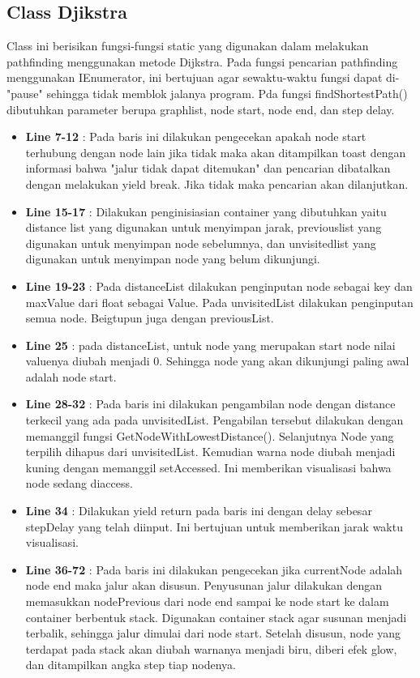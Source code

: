 \documentclass[12pt,a4paper,oneside]{article}
\begin{document}
\subsection{Class Djikstra}
Class ini berisikan fungsi-fungsi static yang digunakan dalam melakukan pathfinding menggunakan metode Dijkstra. Pada fungsi pencarian pathfinding menggunakan IEnumerator, ini bertujuan agar sewaktu-waktu fungsi dapat di-"pause" sehingga tidak memblok jalanya program. Pda fungsi findShortestPath() dibutuhkan parameter berupa graphlist, node start, node end, dan step delay.
\begin{itemize}
	\item \textbf{Line 7-12} : Pada baris ini dilakukan pengecekan apakah node start terhubung dengan node lain jika tidak maka akan ditampilkan toast dengan informasi bahwa "jalur tidak dapat ditemukan" dan pencarian dibatalkan dengan melakukan yield break. Jika tidak maka pencarian akan dilanjutkan.
	\item \textbf{Line 15-17} : Dilakukan penginisiasian container yang dibutuhkan yaitu distance list yang digunakan untuk menyimpan jarak, previouslist yang digunakan untuk menyimpan node sebelumnya, dan unvisitedlist yang digunakan untuk menyimpan node yang belum dikunjungi. 
	\item \textbf{Line 19-23} : Pada distanceList dilakukan penginputan node sebagai key dan maxValue dari float sebagai Value. Pada unvisitedList dilakukan penginputan semua node. Beigtupun juga dengan previousList.
	\item \textbf{Line 25} : pada distanceList, untuk node yang merupakan start node nilai valuenya diubah menjadi 0. Sehingga node yang akan dikunjungi paling awal adalah node start.
	\item \textbf{Line 28-32} : Pada baris ini dilakukan pengambilan node dengan distance terkecil yang ada pada unvisitedList. Pengabilan tersebut dilakukan dengan memanggil fungsi GetNodeWithLowestDistance(). Selanjutnya Node yang terpilih dihapus dari unvisitedList. Kemudian warna node diubah menjadi kuning dengan memanggil setAccessed. Ini memberikan visualisasi bahwa node sedang diaccess.
	\item \textbf{Line 34} : Dilakukan yield return pada baris ini dengan delay sebesar stepDelay yang telah diinput. Ini bertujuan untuk memberikan jarak waktu visualisasi.
	\item \textbf{Line 36-72} : Pada baris ini dilakukan pengecekan jika currentNode adalah node end maka jalur akan disusun. Penyusunan jalur dilakukan dengan memasukkan nodePrevious dari node end sampai ke node start ke dalam container berbentuk stack. Digunakan container stack agar susunan menjadi terbalik, sehingga jalur dimulai dari node start. Setelah disusun, node yang terdapat pada stack akan diubah warnanya menjadi biru, diberi efek glow, dan ditampilkan angka step tiap nodenya.

\end{itemize}
\end{document}
